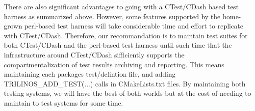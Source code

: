 \documentclass[pdf,ps2pdf,11pt]{SANDreport}
\begin{document}
There are also significant advantages to going with a CTest/CDash
based test harness as summarized above.  However, some features
supported by the home-grown perl-based test harness will take
considerable time and effort to replicate with CTest/CDash.
Therefore, our recommandation is to maintain test suites for both
CTest/CDash and the perl-based test harness until such time that the
infrastructure around CTest/CDash sifficiently supports the
compartmentalization of test results archiving and reporting.  This
means maintaining each packages test/defintion file, and adding
TRILINOS\_ADD\_TEST(...) calls in CMakeLists.txt files.  By
maintaining both testing systems, we will have the best of both worlds
but at the cost of needing to maintain to test systems for some time.


%
\clearpage




\begin{SANDdistribution}[NM]
\end{SANDdistribution}
\end{document}
